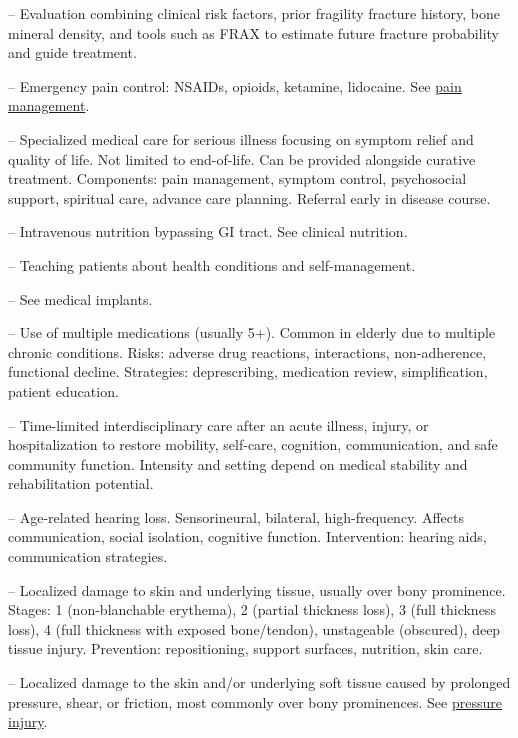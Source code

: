 -- Evaluation combining clinical risk factors, prior fragility fracture history, bone mineral density, and tools such as FRAX to estimate future fracture probability and guide treatment.

-- Emergency pain control: NSAIDs, opioids, ketamine, lidocaine. See \hyperlink{Pain Management}{pain management}.

-- Specialized medical care for serious illness focusing on symptom relief and quality of life. Not limited to end-of-life. Can be provided alongside curative treatment. Components: pain management, symptom control, psychosocial support, spiritual care, advance care planning. Referral early in disease course.

-- Intravenous nutrition bypassing GI tract. See clinical nutrition.

-- Teaching patients about health conditions and self-management.

-- See medical implants.

-- Use of multiple medications (usually 5+). Common in elderly due to multiple chronic conditions. Risks: adverse drug reactions, interactions, non-adherence, functional decline. Strategies: deprescribing, medication review, simplification, patient education.

-- Time-limited interdisciplinary care after an acute illness, injury, or hospitalization to restore mobility, self-care, cognition, communication, and safe community function. Intensity and setting depend on medical stability and rehabilitation potential.

-- Age-related hearing loss. Sensorineural, bilateral, high-frequency. Affects communication, social isolation, cognitive function. Intervention: hearing aids, communication strategies.





-- Localized damage to skin and underlying tissue, usually over bony prominence. Stages: 1 (non-blanchable erythema), 2 (partial thickness loss), 3 (full thickness loss), 4 (full thickness with exposed bone/tendon), unstageable (obscured), deep tissue injury. Prevention: repositioning, support surfaces, nutrition, skin care.

-- Localized damage to the skin and/or underlying soft tissue caused by prolonged pressure, shear, or friction, most commonly over bony prominences. See \hyperlink{Pressure Injury}{pressure injury}.


